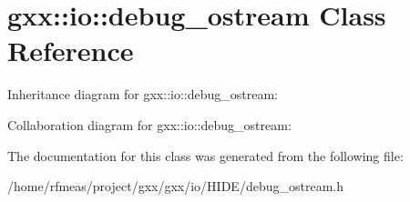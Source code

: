 \hypertarget{classgxx_1_1io_1_1debug__ostream}{}\section{gxx\+:\+:io\+:\+:debug\+\_\+ostream Class Reference}
\label{classgxx_1_1io_1_1debug__ostream}


Inheritance diagram for gxx\+:\+:io\+:\+:debug\+\_\+ostream\+:


Collaboration diagram for gxx\+:\+:io\+:\+:debug\+\_\+ostream\+:


The documentation for this class was generated from the following file\+:\begin{DoxyCompactItemize}
\item 
/home/rfmeas/project/gxx/gxx/io/\+H\+I\+D\+E/debug\+\_\+ostream.\+h\end{DoxyCompactItemize}
